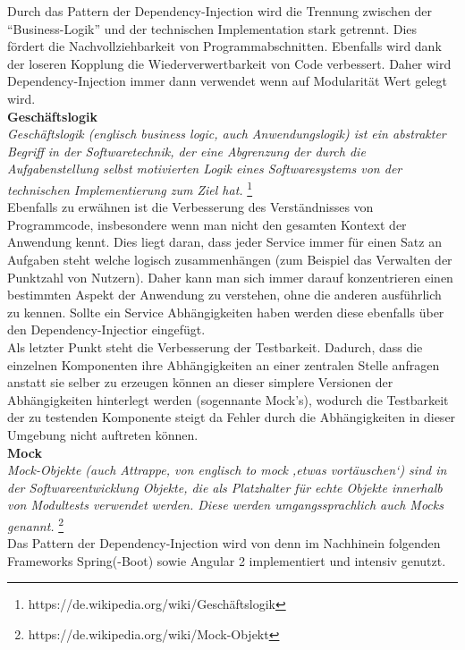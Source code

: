 Durch das Pattern der Dependency-Injection wird die Trennung zwischen der ``Business-Logik'' und der technischen Implementation stark getrennt. Dies fördert die Nachvollziehbarkeit von Programmabschnitten. Ebenfalls wird dank der loseren Kopplung die Wiederverwertbarkeit von Code verbessert. Daher wird Dependency-Injection immer dann verwendet wenn auf Modularität Wert gelegt wird. \\


\textbf{Geschäftslogik} \\
\emph{\glqq   
Geschäftslogik (englisch business logic, auch Anwendungslogik) ist ein abstrakter Begriff in der Softwaretechnik, der eine Abgrenzung der durch die Aufgabenstellung selbst motivierten Logik eines Softwaresystems von der technischen Implementierung zum Ziel hat.
\grqq} \footnote{https://de.wikipedia.org/wiki/Geschäftslogik} \\

Ebenfalls zu erwähnen ist die Verbesserung des Verständnisses von Programmcode, insbesondere wenn man nicht den gesamten Kontext der Anwendung kennt. Dies liegt daran, dass jeder Service immer für einen Satz an Aufgaben steht welche logisch zusammenhängen (zum Beispiel das Verwalten der Punktzahl von Nutzern). Daher kann man sich immer darauf konzentrieren einen bestimmten Aspekt der Anwendung zu verstehen, ohne die anderen ausführlich zu kennen. Sollte ein Service Abhängigkeiten haben werden diese ebenfalls über den Dependency-Injectior eingefügt. \\

Als letzter Punkt steht die Verbesserung der Testbarkeit. Dadurch, dass die einzelnen Komponenten ihre Abhängigkeiten an einer zentralen Stelle anfragen anstatt sie selber zu erzeugen können an dieser simplere Versionen der Abhängigkeiten hinterlegt werden (sogennante Mock's), wodurch die Testbarkeit der zu testenden Komponente steigt da Fehler durch die Abhängigkeiten in dieser Umgebung nicht auftreten können. \\

\textbf{Mock} \\
\emph{\glqq   
Mock-Objekte (auch Attrappe, von englisch to mock ‚etwas vortäuschen‘) sind in der Softwareentwicklung Objekte, die als Platzhalter für echte Objekte innerhalb von Modultests verwendet werden. Diese werden umgangssprachlich auch Mocks genannt.
\grqq} \footnote{https://de.wikipedia.org/wiki/Mock-Objekt} \\

Das Pattern der Dependency-Injection wird von denn im Nachhinein folgenden Frameworks Spring(-Boot) sowie Angular 2 implementiert und intensiv genutzt.





